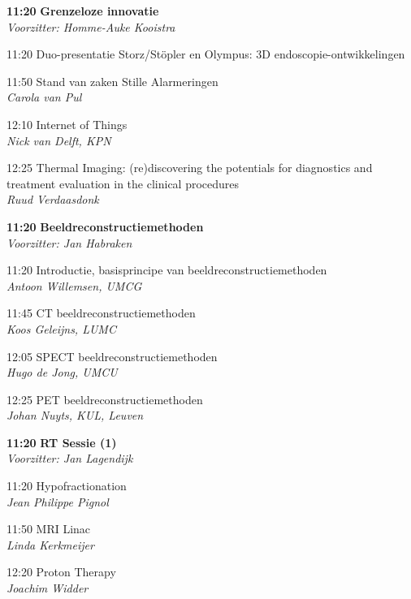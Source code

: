 \documentclass[a4paper,10pt]{report}
\begin{document}
\begin{multicols*}{3}
\vfill
{}
\begin{packed_enum}
\item[\textbf{11:20}]\textbf{Grenzeloze innovatie}\\\textit{Voorzitter: Homme-Auke Kooistra}
\item[11:20] Duo-presentatie Storz/St\"opler en Olympus: 3D endo\-sco\-pie-ontwikkelingen
\item[11:50] Stand van zaken Stille Alarmeringen\\\textit{Carola van Pul}
\item[12:10] Internet of Things\\\textit{Nick van Delft, KPN}
\item[12:25] Thermal Imaging: (re)discovering the potentials for diag\-nostics and treatment evaluation in the clinical procedures\\\textit{Ruud Verdaasdonk}
\end{packed_enum}
\columnbreak

\begin{packed_enum}
\item[\textbf{11:20}]\textbf{Beeldreconstructiemethoden}\\\textit{Voorzitter: Jan Habraken}
\item[11:20] Introductie, basisprincipe van beeldreconstructiemethoden\\\textit{Antoon Willemsen, UMCG}
\item[11:45] CT beeldreconstructiemethoden\\\textit{Koos Geleijns, LUMC}
\item[12:05] SPECT beeldreconstructiemethoden\\\textit{Hugo de Jong, UMCU}
\item[12:25] PET beeldreconstructiemethoden\\\textit{Johan Nuyts, KUL, Leuven}
\end{packed_enum}

\begin{packed_enum}
\item[\textbf{11:20}]{\textbf{RT Sessie (1)}}\\\textit{Voorzitter: Jan Lagendijk}
\item[11:20] Hypofractionation\\\textit{Jean Philippe Pignol}
\item[11:50] MRI Linac\\\textit{Linda Kerkmeijer}
\item[12:20] Proton Therapy\\\textit{Joachim Widder}
\end{packed_enum}


\end{multicols*}
\end{document}
